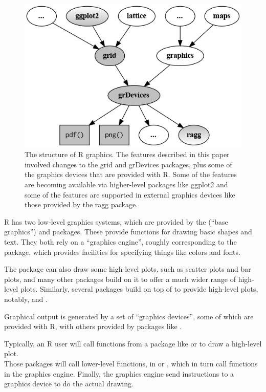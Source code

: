 \begin{figure}

{\centering \includegraphics[width=0.7\linewidth]{figures/rgraphics} 

}

\caption{The structure of R graphics.  The features described in this paper involved changes to the grid and grDevices packages, plus some of the graphics devices that are provided with R. Some of the features are becoming available via higher-level packages like ggplot2 and some of the features are supported in external graphics devices like those provided by the ragg package.}\label{fig:structure}
\end{figure}

R has two low-level graphics systems, which are provided by the
 (``base graphics'') and  packages.
These provide functions for drawing basic shapes and text.
They both rely on a ``graphics engine'', roughly corresponding to
the  package, which provides facilities for specifying
things like colors and fonts.

The  package can also draw some high-level plots,
such as scatter plots and bar plots, and many other packages build
on it to offer a much wider range of high-level plots.
Similarly, several packages build on top of  to provide
high-level plots, notably,  and .

Graphical output is generated by a set of ``graphics devices'',
some of which are provided with R, with others provided by
packages like .

Typically, an R user will call functions from a package like 
or 
to draw a high-level plot.\\
Those packages will call lower-level functions, in 
or , which in turn call functions in the graphics engine.
Finally, the graphics engine send instructions to a graphics device to
do the actual drawing.


